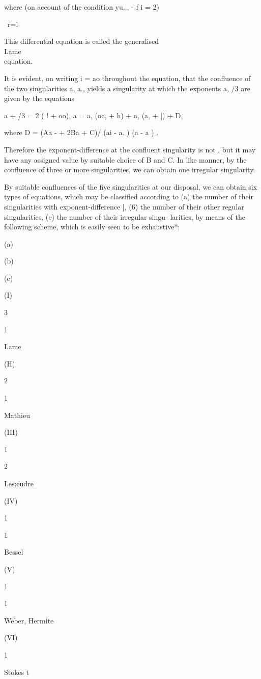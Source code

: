 where (on account of the condition yu.., - f i = 2)

\ r=l

This differential equation is called the generalised \\Lame\\ equation.

It is evident, on writing i = ao throughout the equation, that the
confluence of the two singularities a, a., yields a singularity at
which the exponents a, /3 are given by the equations

a + /3 = 2 ( ! + oo), a = a, (oc, + h) + a, (a, + |) + D,

where D = (Aa - + 2Ba + C)/ (ai - a. ) (a - a ) .

Therefore the exponent-difference at the confluent singularity is not
, but it may have any assigned value by suitable choice of B and C. In
like manner, by the confluence of three or more singularities, we can
obtain one irregular singularity.

By suitable confluences of the five singularities at our disposal, we
can obtain six types of equations, which may be classified according
to (a) the number of their singularities with exponent-difference |,
(6) the number of their other regular singularities, (c) the number of
their irregular singu- larities, by means of the following scheme,
which is easily seen to be exhaustive*:

(a)

(b)

(c)

(I)

3

1

Lame

(H)

2

1

Mathieu

(III)

1

2

Les:eudre

(IV)

1

1

Bessel

(V)

1

1

Weber, Hermite

(VI)

1

Stokes t

